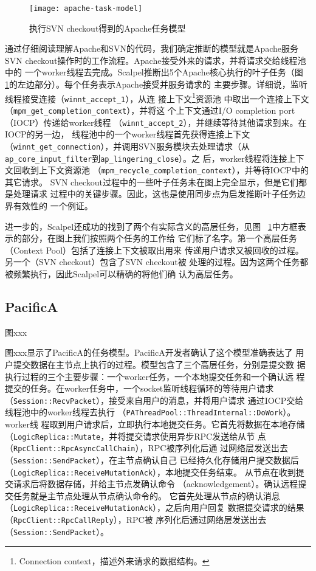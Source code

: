 \begin{figure}
\centering
\texttt{[image: apache-task-model]}
\caption{执行SVN checkout得到的Apache任务模型}
\label{fig:apache_model}
\end{figure}


通过仔细阅读理解Apache和SVN的代码，我们确定推断的模型就是Apache服务SVN
checkout操作时的工作流程。Apache接受外来的请求，并将请求交给线程池中的
一个worker线程去完成。Scalpel推断出5个Apache核心执行的叶子任务（图~
\ref{fig:apache_model}的左边部分）。每个任务表示Apache接受并服务请求的
主要步骤。详细说，监听线程接受连接（\texttt{winnt\_accept\_1}），从连
接上下文\footnote{Connection context，描述外来请求的数据结构。}资源池
中取出一个连接上下文（\texttt{mpm\_get\_completion\_context}），并将这
个上下文通过I/O completion port（IOCP）传递给worker线程
（\texttt{winnt\_accept\_2}），并继续等待其他请求到来。在IOCP的另一边，
线程池中的一个worker线程首先获得连接上下文
（\texttt{winnt\_get\_connection}），并调用SVN服务模块去处理请求（从
\texttt{ap\_core\_input\_filter}到\texttt{ap\_lingering\_close}）。之
后，worker线程将连接上下文回收到上下文资源池
（\texttt{mpm\_recycle\_completion\_context}），并等待IOCP中的其它请求。
SVN checkout过程中的一些叶子任务未在图上完全显示，但是它们都是处理请求
过程中的关键步骤。因此，这也是使用同步点为启发推断叶子任务边界有效性的
一个例证。

进一步的，Scalpel还成功的找到了两个有实际含义的高层任务，见图~
\ref{fig:apache_model}中方框表示的部分，在图上我们按照两个任务的工作给
它们标了名字。第一个高层任务（Context Pool）包括了连接上下文被取出用来
传递用户请求又被回收的过程。另一个（SVN checkout）包含了SVN checkout被
处理的过程。因为这两个任务都被频繁执行，因此Scalpel可以精确的将他们确
认为高层任务。

\subsection{PacificA}

图xxx


图xxx显示了PacificA的任务模型。PacificA开发者确认了这个模型准确表达了
用户提交数据在主节点上执行的过程。模型包含了三个高层任务，分别是提交数
据执行过程的三个主要步骤：一个worker任务，一个本地提交任务和一个确认远
程提交的任务。在worker任务中，一个socket监听线程循环的等待用户请求
（\texttt{Session\-::Recv\-Packet}），接受来自用户的消息，并将用户请求
通过IOCP交给线程池中的worker线程去执行
（\texttt{PA\-Thread\-Pool\-::Thread\-Internal\-::DoWork}）。worker线
程取到用户请求后，立即执行本地提交任务。它首先将数据在本地存储
（\texttt{Logic\-Replica\-::Mutate}，并将提交请求使用异步RPC发送给从节
点（\texttt{Rpc\-Client\-::Rpc\-Async\-Call\-Chain}），RPC被序列化后通
过网络层发送出去（\texttt{Session\-::Send\-Packet}），在主节点确认自己
已经持久化存储用户提交数据后
（\texttt{Logic\-Replica\-::Receive\-MutationAck}），本地提交任务结束。
从节点在收到提交请求后将数据存储，并给主节点发确认命令
（acknowledgement）。确认远程提交任务就是主节点处理从节点确认命令的。
它首先处理从节点的确认消息
（\texttt{Logic\-Replica\-::Receive\-Mutation\-Ack}），之后向用户回复
数据提交请求的结果（\texttt{Rpc\-Client\-::Rpc\-Call\-Reply}），RPC被
序列化后通过网络层发送出去（\texttt{Session\-::Send\-Packet}）。

